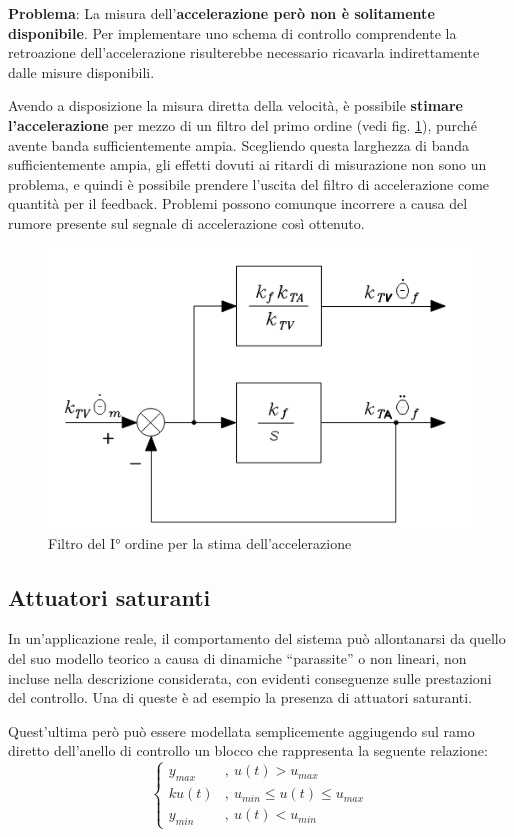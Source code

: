 \textbf{Problema}:
La misura dell’\textbf{accelerazione però non è solitamente disponibile}. Per implementare uno schema di controllo comprendente la retroazione dell’accelerazione risulterebbe necessario ricavarla indirettamente dalle misure disponibili.

Avendo a disposizione la misura diretta della velocità, è possibile \textbf{stimare l’accelerazione} per mezzo di un filtro del primo ordine (vedi fig. \ref{fig:accelerationestimate}), purché avente banda sufficientemente ampia. Scegliendo questa larghezza di banda sufficientemente ampia, gli effetti dovuti ai ritardi di misurazione non sono un problema, e quindi è possibile prendere l'uscita del filtro di accelerazione come quantità per il feedback. Problemi possono comunque incorrere a causa del rumore presente sul segnale di accelerazione così ottenuto.

\begin{figure}[H]
	\centering
	\includegraphics[width=0.4\linewidth]{images/acceleration_estimate}
	\caption{Filtro del I° ordine per la stima dell'accelerazione}
	\label{fig:accelerationestimate}
\end{figure}







\subsection{Attuatori saturanti}
In un’applicazione reale, il comportamento del sistema può allontanarsi da quello del suo modello teorico a causa di dinamiche “parassite” o non lineari, non incluse nella descrizione considerata, con evidenti conseguenze sulle prestazioni del controllo. Una di queste è ad esempio la presenza di attuatori saturanti.

Quest'ultima però può essere modellata semplicemente aggiugendo sul ramo diretto dell’anello di controllo un blocco che rappresenta la seguente relazione:
$$
\begin{cases}
	y_{max} & , \ u(t) > u_{max} \\
	ku(t) & , \ u_{min} \leq u(t) \leq u_{max} \\
	y_{min} & , \ u(t) < u_{min}
\end{cases}
$$


